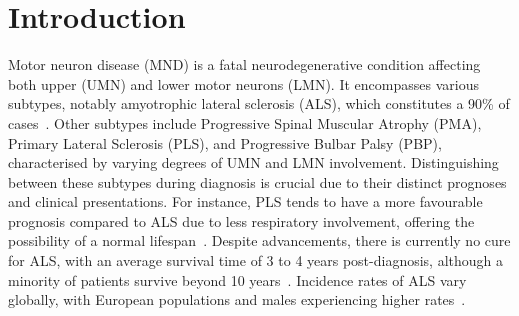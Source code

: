 \chapter{Introduction}
\label{introduction}

%

Motor neuron disease (MND) is a fatal neurodegenerative condition affecting both upper (UMN) and lower motor neurons (LMN).
It encompasses various subtypes, notably amyotrophic lateral sclerosis (ALS), which constitutes a 90\% of cases~\cite{filippiMotorNeuronDiseases2015}.
Other subtypes include Progressive Spinal Muscular Atrophy (PMA), Primary Lateral Sclerosis (PLS), and Progressive Bulbar Palsy (PBP), characterised by varying degrees of UMN and LMN involvement.
Distinguishing between these subtypes during diagnosis is crucial due to their distinct prognoses and clinical presentations.
For instance, PLS tends to have a more favourable prognosis compared to ALS due to less respiratory involvement, offering the possibility of a normal lifespan~\cite{statlandPrimaryLateralSclerosis2015}.
Despite advancements, there is currently no cure for ALS, with an average survival time of 3 to 4 years post-diagnosis, although a minority of patients survive beyond 10 years~\cite{swinnenPhenotypicVariabilityAmyotrophic2014,goutmanRecentAdvancesDiagnosis2022a,pupilloLongtermSurvivalAmyotrophic2014}.
Incidence rates of ALS vary globally, with European populations and males experiencing higher rates~\cite{marinVariationWorldwideIncidence2017,fontanaTimetrendEvolutionDeterminants2021}.


